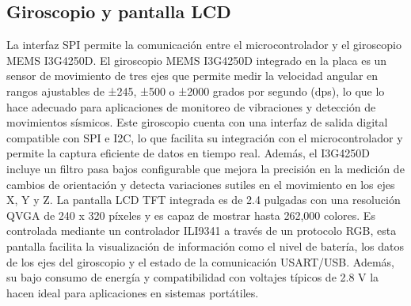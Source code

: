 \subsection{Giroscopio y pantalla LCD}
La interfaz SPI permite la comunicación entre el microcontrolador y el giroscopio MEMS I3G4250D.
El giroscopio MEMS I3G4250D integrado en la placa es un sensor de movimiento de tres ejes que permite medir la velocidad angular en rangos ajustables de ±245, ±500 o ±2000 grados por segundo (dps), lo que lo hace adecuado para aplicaciones de monitoreo de vibraciones y detección de movimientos sísmicos. Este giroscopio cuenta con una interfaz de salida digital compatible con SPI e I2C, lo que facilita su integración con el microcontrolador y permite la captura eficiente de datos en tiempo real. Además, el I3G4250D incluye un filtro pasa bajos configurable que mejora la precisión en la medición de cambios de orientación y detecta variaciones sutiles en el movimiento en los ejes X, Y y Z.
La pantalla LCD TFT integrada es de 2.4 pulgadas con una resolución QVGA de 240 x 320 píxeles y es capaz de mostrar hasta 262,000 colores. Es controlada mediante un controlador ILI9341 a través de un protocolo RGB, esta pantalla facilita la visualización de información como el nivel de batería, los datos de los ejes del giroscopio y el estado de la comunicación USART/USB. Además, su bajo consumo de energía y compatibilidad con voltajes típicos de 2.8 V la hacen ideal para aplicaciones en sistemas portátiles.

